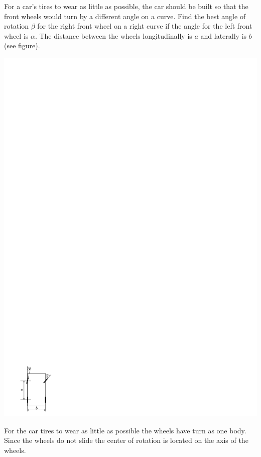 {\ifEngStatement
For a car’s tires to wear as little as possible, the car should be built so that the front wheels would turn by a different angle on a curve. Find the best angle of rotation $\beta$ for the right front wheel on a right curve if the angle for the left front wheel is $\alpha$. The distance between the wheels longitudinally is $a$ and laterally is $b$ (see figure).
\begin{center}
\includegraphics[width=0.3\linewidth]{2012-v3g-05-r_yl_joonis}%
\end{center}
\fi


\ifEngHint
For the car tires to wear as little as possible the wheels have turn as one body. Since the wheels do not slide the center of rotation is located on the axis of the wheels.
\fi


}
